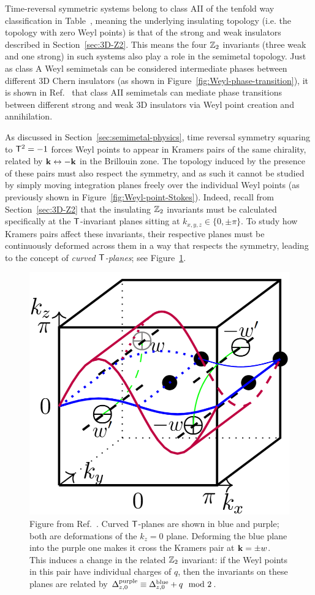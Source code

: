 Time-reversal symmetric systems belong to class AII of the tenfold way classification in Table~, %
meaning the underlying insulating topology (i.e. the topology with zero Weyl points) is that of the strong and weak insulators described in Section~\ref{sec:3D-Z2}. This means the four $\mathbb{Z}_2$ invariants (three weak and one strong) in such systems also play a role in the semimetal topology. Just as class A Weyl semimetals can be considered intermediate phases between different 3D Chern insulators (as shown in Figure~\ref{fig:Weyl-phase-transition}), it is shown in Ref.~\cite{Thiang_equivariant} that class AII semimetals can mediate phase transitions between different strong and weak 3D insulators via Weyl point creation and annihilation.

As discussed in Section~\ref{sec:semimetal-physics}, time reversal symmetry squaring to $\mathsf{T}^2=-1$ forces Weyl points to appear in Kramers pairs of the same chirality, related by $\vb{k}\leftrightarrow-\vb{k}$ in the Brillouin zone. The topology induced by the presence of these pairs must also respect the symmetry, and as such it cannot be studied by simply moving integration planes freely over the individual Weyl points (as previously shown in Figure~\ref{fig:Weyl-point-Stokes}). Indeed, recall from Section~\ref{sec:3D-Z2} that the insulating $\mathbb{Z}_2$ invariants must be calculated specifically at the $\mathsf{T}$-invariant planes sitting at $k_{x,y,z}\in\{0,\pm\pi\}$. To study how Kramers pairs affect these invariants, their respective planes must be continuously deformed across them in a way that respects the symmetry, leading to the concept of \emph{curved $\mathsf{T}$-planes}; see Figure~\ref{fig:T-planes}.
\begin{figure}[htb!]
	\centering
	\includegraphics[width=.5\linewidth]{Images/T-planes}
	\caption{Figure from Ref.~\cite{Thiang_equivariant}. Curved $\mathsf{T}$-planes are shown in blue and purple; both are deformations of the $k_z=0$ plane. Deforming the blue plane into the purple one makes it cross the Kramers pair at $\vb{k}=\pm w$. This induces a change in the related $\mathbb{Z}_2$ invariant: if the Weyl points in this pair have individual charges of $q$, then the invariants on these planes are related by $\Delta_{z,0}^{\rm purple} \equiv \Delta_{z,0}^{\rm blue} + q \mod 2$.} %
	\label{fig:T-planes}
\end{figure}

